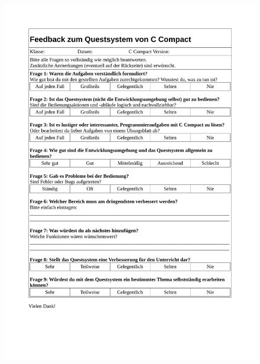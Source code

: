 \documentclass[11pt, oneside]{book}   		%
\begin{document}
\begin{figure}[h!]
	\centering
	\includegraphics[width=1.0\textwidth]{./media/docs/Fragebogen-quest.pdf}
	\label{fig:app-doc-fb-quest}
\end{figure}

%

%	

%

%
\end{document}
